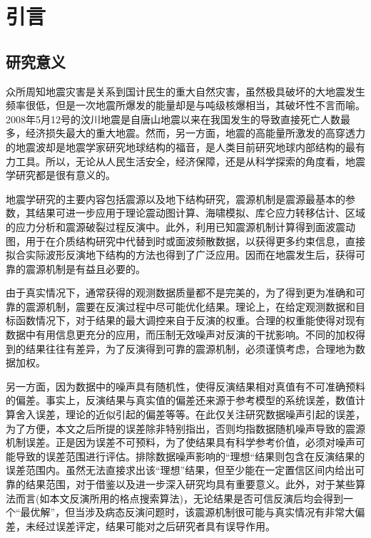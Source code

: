 

\chapter{引言}

\section{研究意义}

众所周知地震灾害是关系到国计民生的重大自然灾害，虽然极具破坏的大地震发生频率很低，但是一次地震所爆发的能量却是与吨级核爆相当\citep{Stein2003}，其破坏性不言而喻。2008年5月12号的汶川地震是自唐山地震以来在我国发生的导致直接死亡人数最多，经济损失最大的重大地震。然而，另一方面，地震的高能量所激发的高穿透力的地震波却是地震学家研究地球结构的福音，是人类目前研究地球内部结构的最有力工具。所以，无论从人民生活安全，经济保障，还是从科学探索的角度看，地震学研究都是很有意义的。

地震学研究的主要内容包括震源以及地下结构研究，震源机制是震源最基本的参数，其结果可进一步应用于理论震动图计算\citep{Wald2005}、海啸模拟\citep{Satake2007}、库仑应力转移估计\citep{King2007}、区域的应力分析和震源破裂过程反演中\citep{Kilb2001}。此外，利用已知震源机制计算得到面波震动图，用于在介质结构研究中代替到时或面波频散数据，以获得更多约束信息，直接拟合实际波形反演地下结构的方法也得到了广泛应用\citep{Nolet1990,Manaman2011,Friederich2003,Zielhuis1994,Cao2001,Lee1997}。因而在地震发生后，获得可靠的震源机制是有益且必要的。

由于真实情况下，通常获得的观测数据质量都不是完美的，为了得到更为准确和可靠的震源机制，震要在反演过程中尽可能优化结果。理论上，在给定观测数据和目标函数情况下，对于结果的最大调控来自于反演的权重。合理的权重能使得对现有数据中有用信息更充分的应用，而压制无效噪声对反演的干扰影响。不同的加权得到的结果往往有差异，为了反演得到可靠的震源机制，必须谨慎考虑，合理地为数据加权。

另一方面，因为数据中的噪声具有随机性，使得反演结果相对真值有不可准确预料的偏差。事实上，反演结果与真实值的偏差还来源于参考模型的系统误差，数值计算舍入误差，理论的近似引起的偏差等等。在此仅关注研究数据噪声引起的误差，为了方便，本文之后所提的误差除非特别指出，否则均指数据随机噪声导致的震源机制误差。正是因为误差不可预料，为了使结果具有科学参考价值，必须对噪声可能导致的误差范围进行评估。排除数据噪声影响的“理想“结果则包含在反演结果的误差范围内。虽然无法直接求出该“理想”结果，但至少能在一定置信区间内给出可靠的结果范围，对于借鉴以及进一步深入研究均具有重要意义。此外，对于某些算法而言(如本文反演所用的格点搜索算法)，无论结果是否可信反演后均会得到一个“最优解”，但当涉及病态反演问题时，该震源机制很可能与真实情况有非常大偏差，未经过误差评定，结果可能对之后研究者具有误导作用。


